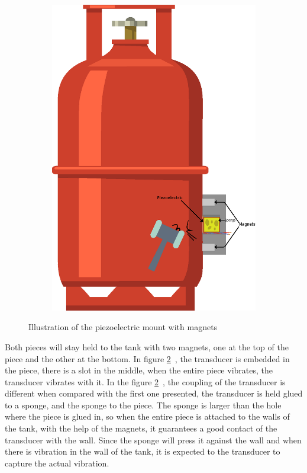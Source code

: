 \begin{figure}[]
\begin{subfigure}{0.3\textwidth}
        \includegraphics[width=\linewidth]{Chapters/4CHP/Figures/PiezoMagnets.eps}
        \caption{}{}
        \label{subfig:piezosponge}
    \end{subfigure}
    \caption{Illustration of the piezoelectric mount with magnets}{}
    \label{fig:coupPiezo}
\end{figure}

Both pieces will stay held to the tank with two magnets, one at the top of the piece and the other at the bottom. In figure \ref{fig:coupPiezo}~, the transducer is embedded in the piece, there is a slot in the middle, when the entire piece vibrates, the transducer vibrates with it. In the figure \ref{fig:coupPiezo}~, the coupling of the transducer is different when compared with the first one presented, the transducer is held glued to a sponge, and the sponge to the piece. The sponge is larger than the hole where the piece is glued in, so when the entire piece is attached to the walls of the tank, with the help of the magnets, it guarantees a good contact of the transducer with the wall. Since the sponge will press it against the wall and when there is vibration in the wall of the tank, it is expected to the transducer to capture the actual vibration. 

